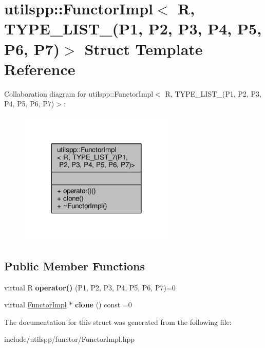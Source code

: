 \hypertarget{structutilspp_1_1FunctorImpl_3_01R_00_01TYPE__LIST__7_07P1_00_01P2_00_01P3_00_01P4_00_01P5_00_01P6_00_01P7_08_4}{\section{utilspp\-:\-:Functor\-Impl$<$ R, T\-Y\-P\-E\-\_\-\-L\-I\-S\-T\-\_(P1, P2, P3, P4, P5, P6, P7)$>$ Struct Template Reference}
\label{structutilspp_1_1FunctorImpl_3_01R_00_01TYPE__LIST__7_07P1_00_01P2_00_01P3_00_01P4_00_01P5_00_01P6_00_01P7_08_4}
}


Collaboration diagram for utilspp\-:\-:Functor\-Impl$<$ R, T\-Y\-P\-E\-\_\-\-L\-I\-S\-T\-\_(P1, P2, P3, P4, P5, P6, P7)$>$\-:
\nopagebreak
\begin{figure}[H]
\begin{center}
\leavevmode
\includegraphics[width=210pt]{structutilspp_1_1FunctorImpl_3_01R_00_01TYPE__LIST__7_07P1_00_01P2_00_01P3_00_01P4_00_01P5_00_01P6_00_01P7_08_4__coll__graph}
\end{center}
\end{figure}
\subsection*{Public Member Functions}
\begin{DoxyCompactItemize}
\item 
\hypertarget{structutilspp_1_1FunctorImpl_3_01R_00_01TYPE__LIST__7_07P1_00_01P2_00_01P3_00_01P4_00_01P5_00_01P6_00_01P7_08_4_ae63dcd25d31c4d0fe9b1a074ae67c369}{virtual R {\bfseries operator()} (P1, P2, P3, P4, P5, P6, P7)=0}\label{structutilspp_1_1FunctorImpl_3_01R_00_01TYPE__LIST__7_07P1_00_01P2_00_01P3_00_01P4_00_01P5_00_01P6_00_01P7_08_4_ae63dcd25d31c4d0fe9b1a074ae67c369}

\item 
\hypertarget{structutilspp_1_1FunctorImpl_3_01R_00_01TYPE__LIST__7_07P1_00_01P2_00_01P3_00_01P4_00_01P5_00_01P6_00_01P7_08_4_a4c23500842c1715489f8accebb16a3eb}{virtual \hyperlink{structutilspp_1_1FunctorImpl}{Functor\-Impl} $\ast$ {\bfseries clone} () const =0}\label{structutilspp_1_1FunctorImpl_3_01R_00_01TYPE__LIST__7_07P1_00_01P2_00_01P3_00_01P4_00_01P5_00_01P6_00_01P7_08_4_a4c23500842c1715489f8accebb16a3eb}

\end{DoxyCompactItemize}


The documentation for this struct was generated from the following file\-:\begin{DoxyCompactItemize}
\item 
include/utilspp/functor/Functor\-Impl.\-hpp\end{DoxyCompactItemize}
